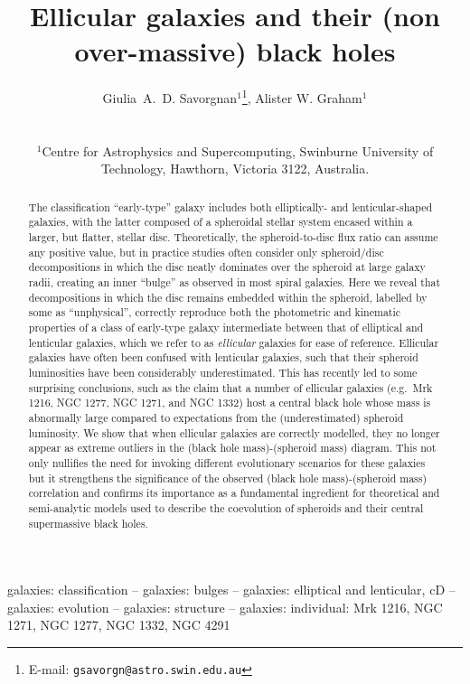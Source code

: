 \documentclass[useAMS,usenatbib,article]{mnras}
\title[Ellicular galaxies]{Ellicular galaxies and their (non over-massive) black holes}
\author[G.~A.~D. Savorgnan \& A.~W. Graham]
{\parbox{\textwidth}{
Giulia~A.~D. Savorgnan$^{1}$\thanks{E-mail: \texttt{gsavorgn@astro.swin.edu.au}},
Alister W. Graham$^{1}$}\vspace{0.4cm}\\
\parbox{\textwidth}{
$^{1}$Centre for Astrophysics and Supercomputing, Swinburne University of Technology, Hawthorn, Victoria 3122, Australia.\\}}
\begin{document}
\maketitle

\label{firstpage}



\begin{abstract}
The classification ``early-type'' galaxy includes both elliptically- and lenticular-shaped galaxies, 
with the latter composed of a spheroidal stellar system encased within a larger, but flatter, stellar disc. 
Theoretically, the spheroid-to-disc flux ratio can assume any positive value,  
but in practice studies often consider only spheroid/disc decompositions 
in which the disc neatly dominates over the spheroid at large galaxy radii, 
creating an inner ``bulge'' as observed in most spiral galaxies. 
Here we reveal that decompositions in which the disc remains embedded within the spheroid, labelled by some as ``unphysical'',  
correctly reproduce both the photometric and kinematic properties of a class of early-type galaxy 
intermediate between that of elliptical and lenticular galaxies, which we refer to as \emph{ellicular} galaxies for ease of reference. 
Ellicular galaxies have often been confused with lenticular galaxies, 
such that their spheroid luminosities have been considerably underestimated. 
This has recently led to some surprising conclusions, 
such as the claim that a number of ellicular galaxies (e.g.~Mrk 1216, NGC 1277, NGC 1271, and NGC 1332) 
host a central black hole whose mass is abnormally large compared to expectations from the (underestimated) spheroid luminosity. 
We show that when ellicular galaxies are correctly modelled, 
they no longer appear as extreme outliers in the (black hole mass)-(spheroid mass) diagram. 
This not only nullifies the need for invoking different evolutionary scenarios for these galaxies 
but it strengthens the significance of the observed (black hole mass)-(spheroid mass) correlation 
and confirms its importance as a fundamental ingredient for theoretical and semi-analytic models 
used to describe the coevolution of spheroids and their central supermassive black holes. 

\end{abstract}

\begin{keywords}
galaxies: classification -- galaxies: bulges -- galaxies: elliptical and lenticular, 
cD -- galaxies: evolution -- galaxies: structure -- galaxies: individual: Mrk 1216, NGC 1271, NGC 1277, NGC 1332, NGC 4291
\end{keywords}
\end{document}
